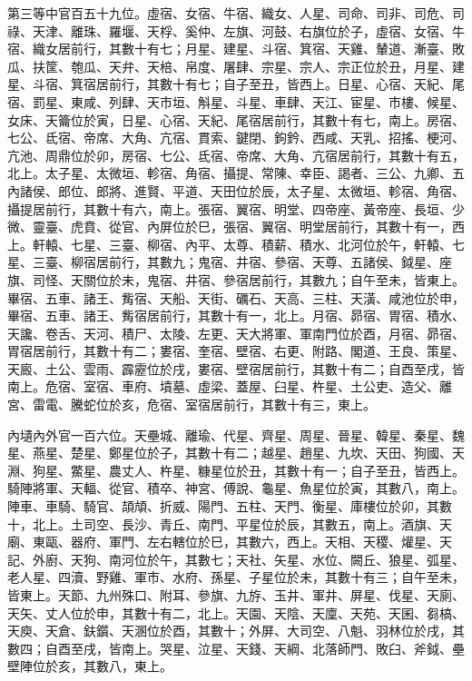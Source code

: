 \begin{pinyinscope}
 第三等中官百五十九位。虛宿、女宿、牛宿、織女、人星、司命、司非、司危、司祿、天津、離珠、羅堰、天桴、奚仲、左旗、河鼓、右旗位於子，虛宿、女宿、牛宿、織女居前行，其數十有七；月星、建星、斗宿、箕宿、天雞、輦道、漸臺、敗瓜、扶筐、匏瓜、天弁、天棓、帛度、屠肆、宗星、宗人、宗正位於丑，月星、建星、斗宿、箕宿居前行，其數十有七；自子至丑，皆西上。日星、心宿、天紀、尾宿、罰星、東咸、列肆、天市垣、斛星、斗星、車肆、天江、宦星、市樓、候星、女床、天籥位於寅，日星、心宿、天紀、尾宿居前行，其數十有七，南上。房宿、七公、氐宿、帝席、大角、亢宿、貫索、鍵閉、鉤鈐、西咸、天乳、招搖、梗河、亢池、周鼎位於卯，房宿、七公、氐宿、帝席、大角、亢宿居前行，其數十有五，北上。太子星、太微垣、軫宿、角宿、攝提、常陳、幸臣、謁者、三公、九卿、五內諸侯、郎位、郎將、進賢、平道、天田位於辰，太子星、太微垣、軫宿、角宿、攝提居前行，其數十有六，南上。張宿、翼宿、明堂、四帝座、黃帝座、長垣、少微、靈臺、虎賁、從官、內屏位於巳，張宿、翼宿、明堂居前行，其數十有一，西上。軒轅、七星、三臺、柳宿、內平、太尊、積薪、積水、北河位於午，軒轅、七星、三臺、柳宿居前行，其數九；鬼宿、井宿、參宿、天尊、五諸侯、鉞星、座旗、司怪、天關位於未，鬼宿、井宿、參宿居前行，其數九；自午至未，皆東上。畢宿、五車、諸王、觜宿、天船、天街、礪石、天高、三柱、天潢、咸池位於申，畢宿、五車、諸王、觜宿居前行，其數十有一，北上。月宿、昴宿、胃宿、積水、天讒、卷舌、天河、積尸、太陵、左更、天大將軍、軍南門位於酉，月宿、昴宿、胃宿居前行，其數十有二；婁宿、奎宿、壁宿、右更、附路、閣道、王良、策星、天廄、土公、雲雨、霹靂位於戌，婁宿、壁宿居前行，其數十有二；自酉至戌，皆南上。危宿、室宿、車府、墳墓、虛梁、蓋屋、臼星、杵星、土公吏、造父、離宮、雷電、騰蛇位於亥，危宿、室宿居前行，其數十有三，東上。



 內壝內外官一百六位。天壘城、離瑜、代星、齊星、周星、晉星、韓星、秦星、魏星、燕星、楚星、鄭星位於子，其數十有二；越星、趙星、九坎、天田、狗國、天淵、狗星、鱉星、農丈人、杵星、糠星位於丑，其數十有一；自子至丑，皆西上。騎陣將軍、天輻、從官、積卒、神宮、傅說、龜星、魚星位於寅，其數八，南上。陣車、車騎、騎官、頡頏、折威、陽門、五柱、天門、衡星、庫樓位於卯，其數十，北上。土司空、長沙、青丘、南門、平星位於辰，其數五，南上。酒旗、天廟、東甌、器府、軍門、左右轄位於巳，其數六，西上。天相、天稷、爟星、天記、外廚、天狗、南河位於午，其數七；天社、矢星、水位、闕丘、狼星、弧星、老人星、四瀆、野雞、軍市、水府、孫星、子星位於未，其數十有三；自午至未，皆東上。天節、九州殊口、附耳、參旗、九斿、玉井、軍井、屏星、伐星、天廁、天矢、丈人位於申，其數十有二，北上。天園、天陰、天廩、天苑、天囷、芻槁、天庾、天倉、鈇鑕、天溷位於酉，其數十；外屏、大司空、八魁、羽林位於戌，其數四；自酉至戌，皆南上。哭星、泣星、天錢、天綱、北落師門、敗臼、斧鉞、壘壁陣位於亥，其數八，東上。




\end{pinyinscope}
